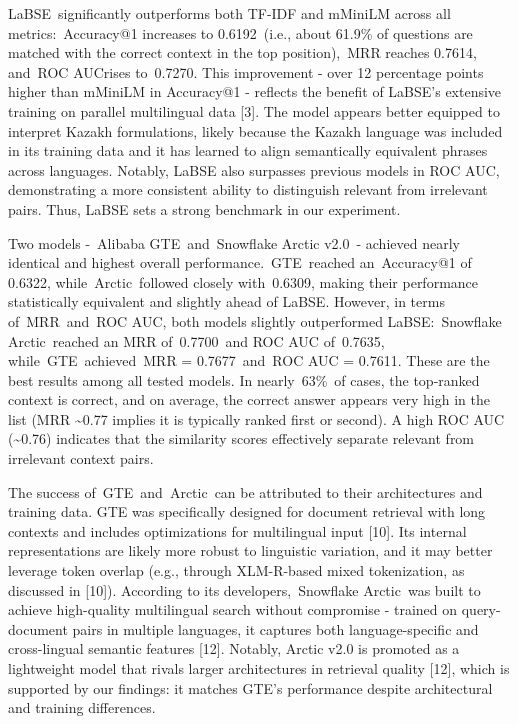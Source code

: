 \begin{multicols}{2}
LaBSE~significantly outperforms both TF-IDF and mMiniLM across all
metrics:~Accuracy@1 increases to 0.6192~(i.e., about 61.9\% of questions
are matched with the correct context in the top position),~MRR reaches
0.7614, and~ROC AUCrises to~0.7270. This improvement - over 12
percentage points higher than mMiniLM in Accuracy@1 - reflects the
benefit of LaBSE's extensive training on parallel multilingual data
{[}3{]}. The model appears better equipped to interpret Kazakh
formulations, likely because the Kazakh language was included in its
training data and it has learned to align semantically equivalent
phrases across languages. Notably, LaBSE also surpasses previous models
in ROC AUC, demonstrating a more consistent ability to distinguish
relevant from irrelevant pairs. Thus, LaBSE sets a strong benchmark in
our experiment.

Two models -~Alibaba GTE~and~Snowflake Arctic v2.0~- achieved nearly
identical and highest overall performance.~GTE~reached an~Accuracy@1 of
0.6322, while~Arctic~followed closely with~0.6309, making their
performance statistically equivalent and slightly ahead of LaBSE.
However, in terms of~MRR~and~ROC AUC, both models slightly outperformed
LaBSE:~Snowflake Arctic~reached an MRR of~0.7700~and ROC AUC of~0.7635,
while~GTE~achieved~MRR = 0.7677~and~ROC AUC = 0.7611. These are the best
results among all tested models. In nearly~63\%~of cases, the top-ranked
context is correct, and on average, the correct answer appears very high
in the list (MRR \textasciitilde0.77 implies it is typically ranked
first or second). A high ROC AUC (\textasciitilde0.76) indicates that
the similarity scores effectively separate relevant from irrelevant
context pairs.

The success of~GTE~and~Arctic~can be attributed to their architectures
and training data. GTE was specifically designed for document retrieval
with long contexts and includes optimizations for multilingual input
{[}10{]}. Its internal representations are likely more robust to
linguistic variation, and it may better leverage token overlap (e.g.,
through XLM-R-based mixed tokenization, as discussed in {[}10{]}).
According to its developers,~Snowflake Arctic~was built to achieve
high-quality multilingual search without compromise - trained on
query-document pairs in multiple languages, it captures both
language-specific and cross-lingual semantic features {[}12{]}. Notably,
Arctic v2.0 is promoted as a lightweight model that rivals larger
architectures in retrieval quality {[}12{]}, which is supported by our
findings: it matches GTE's performance despite architectural and
training differences.


\end{multicols}
